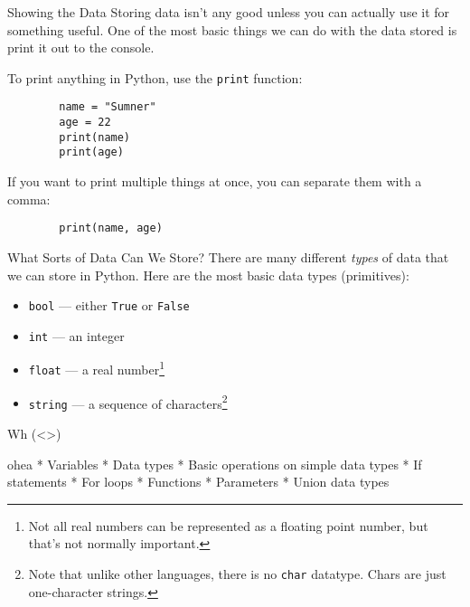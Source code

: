 \documentclass{acm}
\begin{document}
\begin{frame}[fragile]{Showing the Data}
    Storing data isn't any good unless you can actually use it for something
    useful. \pause One of the most basic things we can do with the data stored
    is print it out to the console.

    To print anything in Python, use the \texttt{print} function:
    \begin{verbatim}
        name = "Sumner"
        age = 22
        print(name)
        print(age)
    \end{verbatim}

    \pause
    If you want to print multiple things at once, you can separate them with a
    comma:
    \begin{verbatim}
        print(name, age)
    \end{verbatim}
\end{frame}

\begin{frame}{What Sorts of Data Can We Store?}
    There are many different \textit{types} of data that we can store in Python.
    Here are the most basic data types (primitives):

    \begin{itemize}
        \item \texttt{bool} --- either \texttt{True} or \texttt{False}
        \item \texttt{int} --- an integer
        \item \texttt{float} --- a real number\footnote[frame]{Not all real
            numbers can be represented as a floating point number, but that's
            not normally important.}
        \item \texttt{string} --- a sequence of characters\footnote[frame]{Note
            that unlike other languages, there is no \texttt{char} datatype.
            Chars are just one-character strings.}
    \end{itemize}
\end{frame}

\begin{frame}{Wh}
    (<>)
\end{frame}

\begin{frame}{ohea}
    * Variables
        * Data types
    * Basic operations on simple data types
    * If statements
    * For loops
    * Functions
        * Parameters
    * Union data types
\end{frame}
\end{document}
